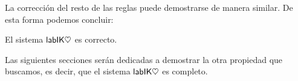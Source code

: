 La corrección del resto de las reglas puede demostrarse de manera similar. De esta forma podemos concluir:

\begin{teo} El sistema $\mathsf{labIK\heartsuit}$ es correcto.\end{teo}

Las siguientes secciones serán dedicadas a demostrar la otra propiedad que buscamos, es decir, que el sistema $\mathsf{labIK\heartsuit}$ es completo.